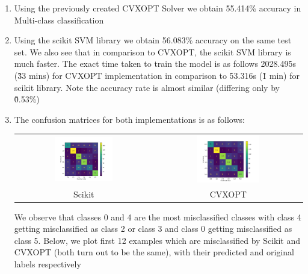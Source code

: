 \begin{enumerate}[label=(\alph*)]
    \item Using the previously created CVXOPT Solver we obtain 55.414\% accuracy in Multi-class classification
    \item Using the scikit SVM library we obtain 56.083\% accuracy on the same test set. We also see that in comparison to CVXOPT, the scikit SVM library is much faster. The exact time taken to train the model is as follows 2028.495s (\~ 33 mins) for CVXOPT implementation in comparison to 53.316s (\~ 1 min) for scikit library. Note the accuracy rate is almost similar (differing only by \~0.53\%)

    \item The confusion matrices for both implementations is as follows:
    \begin{center}
        \begin{tabular}{c c}
            \includegraphics[width=0.44\textwidth]{Images/Q2_multi/confusion_sklearn.png} & \includegraphics[width=0.44\textwidth]{Images/Q2_multi/confusion_cvxopt.png} \\
            Scikit & CVXOPT 
        \end{tabular}
    \end{center}

   We observe that classes 0 and 4 are the most misclassified classes with class 4 getting misclassified as class 2 or class 3 and class 0 getting misclassified as class 5. Below, we plot first 12 examples which are misclassified by Scikit and CVXOPT (both turn out to be the same), with their {\color{red} predicted} and {\color{green} original} labels respectively


\end{enumerate}
